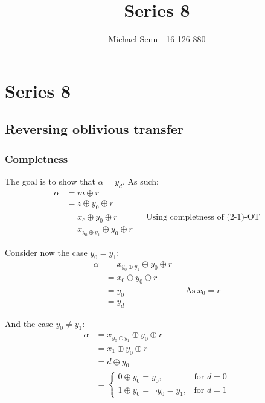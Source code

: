 \documentclass[a4paper]{scrreprt}
\title{Series 8}
\author{Michael Senn \maillink{michael.senn@students.unibe.ch} - 16-126-880}
\date{\printdate}
\begin{document}
\maketitle


\setcounter{chapter}{7}

\chapter{Series 8}

\section{Reversing oblivious transfer}

\subsection{Completness}

The goal is to show that $\alpha = y_d$. As such:
\begin{align*}
		\alpha & = m \oplus r \\
			   & = z \oplus y_0 \oplus r \\
			   & = x_c \oplus y_0 \oplus r && \text{Using completness of (2-1)-OT} \\
			   & = x_{y_0 \oplus y_1} \oplus y_0 \oplus r
\end{align*}

Consider now the case $y_0 = y_1$:
\begin{align*}
		\alpha & = x_{y_0 \oplus y_1} \oplus y_0 \oplus r \\
			   & = x_0 \oplus y_0 \oplus r \\
			   & = y_0 && \text{As}\ x_0 = r \\
			   & = y_d
\end{align*}

And the case $y_0 \neq y_1$:
\begin{align*}
		\alpha & = x_{y_0 \oplus y_1} \oplus y_0 \oplus r \\
			   & = x_1 \oplus y_0 \oplus r \\
			   & = d \oplus y_0 \\
			   & = \left\{
					   \begin{array}{ll}
							   0 \oplus y_0 = y_0, & \text{for } d = 0 \\
							   1 \oplus y_0 = \neg y_0 = y_1, & \text{for } d = 1
					   \end{array}
				   \right.
\end{align*}
\end{document}
